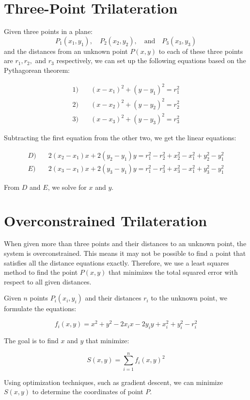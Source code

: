\documentclass{article}
\begin{document}
\section*{Three-Point Trilateration}

Given three points in a plane: 
\[ P_1(x_1, y_1), \quad P_2(x_2, y_2), \quad \text{and} \quad P_3(x_3, y_3) \]
and the distances from an unknown point \( P(x, y) \) to each of these three points are \( r_1, r_2, \) and \( r_3 \) respectively, we can set up the following equations based on the Pythagorean theorem:

\begin{align*}
1) & \quad (x - x_1)^2 + (y - y_1)^2 = r_1^2 \\
2) & \quad (x - x_2)^2 + (y - y_2)^2 = r_2^2 \\
3) & \quad (x - x_3)^2 + (y - y_3)^2 = r_3^2
\end{align*}

Subtracting the first equation from the other two, we get the linear equations:

\begin{align*}
D) & \quad 2(x_2 - x_1)x + 2(y_2 - y_1)y = r_1^2 - r_2^2 + x_2^2 - x_1^2 + y_2^2 - y_1^2 \\
E) & \quad 2(x_3 - x_1)x + 2(y_3 - y_1)y = r_1^2 - r_3^2 + x_3^2 - x_1^2 + y_3^2 - y_1^2
\end{align*}

From \(D\) and \(E\), we solve for \(x\) and \(y\).

\section*{Overconstrained Trilateration}

When given more than three points and their distances to an unknown point, the system is overconstrained. This means it may not be possible to find a point that satisfies all the distance equations exactly. Therefore, we use a least squares method to find the point \( P(x, y) \) that minimizes the total squared error with respect to all given distances.

Given \( n \) points \( P_i(x_i, y_i) \) and their distances \( r_i \) to the unknown point, we formulate the equations:

\[ f_i(x, y) = x^2 + y^2 - 2x_i x - 2y_i y + x_i^2 + y_i^2 - r_i^2 \]

The goal is to find \(x\) and \(y\) that minimize:

\[ S(x, y) = \sum_{i=1}^n f_i(x, y)^2 \]

Using optimization techniques, such as gradient descent, we can minimize \( S(x, y) \) to determine the coordinates of point \( P \).
\end{document}
